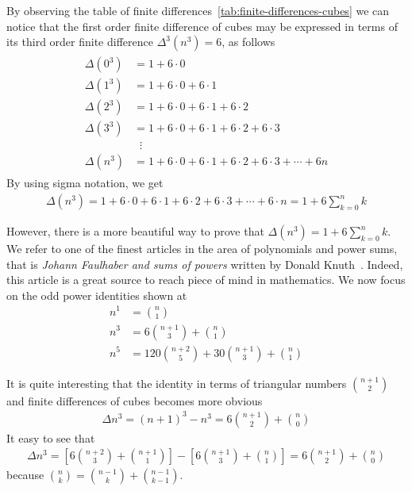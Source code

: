 By observing the table of finite differences~\eqref{tab:finite-differences-cubes} we can notice that
the first order finite difference of cubes may be expressed in terms of its
third order finite difference $\Delta^3(n^3) = 6$, as follows
\begin{align*}
    \begin{split}
        \Delta(0^3) &= 1+6 \cdot 0 \\
        \Delta(1^3) &= 1+6\cdot0+6\cdot1 \\
        \Delta(2^3) &= 1+6\cdot0+6\cdot1+6\cdot2 \\
        \Delta(3^3) &= 1+6\cdot0+6\cdot1+6\cdot2+6\cdot3 \\
        &\; \; \vdots \\
        \Delta(n^3) &= 1+6\cdot0+6\cdot1+6\cdot2+6\cdot3 + \cdots + 6n
    \end{split}
\end{align*}
By using sigma notation, we get
\begin{align*}
    \Delta(n^3) = 1+6\cdot0+6\cdot1+6\cdot2+6\cdot3+\cdots+6\cdot n = 1 + 6 \sum_{k=0}^{n} k
\end{align*}

However, there is a more beautiful way to prove that $\Delta(n^3) = 1 + 6 \sum_{k=0}^{n} k$.
We refer to one of the finest articles in the area of polynomials and power sums,
that is \textit{Johann Faulhaber and sums of powers} written by Donald Knuth~\cite{knuth1993johann}.
Indeed, this article is a great source to reach piece of mind in mathematics.
We now focus on the odd power identities shown at~\cite[~p. 9]{knuth1993johann}
\begin{align*}
    n^1 &= \binom{n}{1} \\
    n^3 &= 6 \binom{n+1}{3} + \binom{n}{1} \\
    n^5 &= 120 \binom{n+2}{5} + 30 \binom{n+1}{3} + \binom{n}{1}
\end{align*}

It is quite interesting that the identity in terms of triangular numbers $\binom{n+1}{2}$
and finite differences of cubes becomes more obvious
\begin{align*}
    \Delta n^3
    = (n+1)^3 - n^3
    =  6 \binom{n+1}{2} + \binom{n}{0}
\end{align*}
It easy to see that
\begin{align*}
    \Delta n^3
    = \left[ 6 \binom{n+2}{3} + \binom{n+1}{1} \right] - \left[ 6 \binom{n+1}{3} + \binom{n}{1} \right]
    = 6 \binom{n+1}{2} + \binom{n}{0}
\end{align*}
because $\binom{n}{k} = \binom{n-1}{k} + \binom{n-1}{k-1}$.


